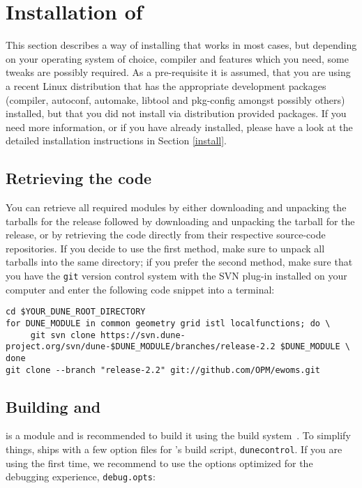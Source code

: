 \section{Installation of \eWoms} \label{quick-install}

This section describes a way of installing \eWoms that works in most
cases, but depending on your operating system of choice, \Cplusplus
compiler and features which you need, some tweaks are possibly
required. As a pre-requisite it is assumed, that you are using a
recent Linux distribution that has the appropriate development
packages (\Cplusplus compiler, autoconf, automake, libtool and
pkg-config amongst possibly others) installed, but that you did not
install \Dune via distribution provided packages.  If you need more
information, or if you have \Dune already installed, please have a
look at the detailed installation instructions in Section
\ref{install}.

\subsection{Retrieving the code}


You can retrieve all required \Dune modules by either downloading and
unpacking the tarballs for the  release followed by
downloading and unpacking the tarball for the  release, or
by retrieving the code directly from their respective source-code
repositories. If you decide to use the first method, make sure to
unpack all tarballs into the same directory; if you prefer the second
method, make sure that you have the \texttt{git} version control
system with the SVN plug-in installed on your computer and enter the
following code snippet into a terminal:
\begin{lstlisting}[style=Bash]
cd $YOUR_DUNE_ROOT_DIRECTORY
for DUNE_MODULE in common geometry grid istl localfunctions; do \
     git svn clone https://svn.dune-project.org/svn/dune-$DUNE_MODULE/branches/release-2.2 $DUNE_MODULE \
done
git clone --branch "release-2.2" git://github.com/OPM/ewoms.git
\end{lstlisting}

\subsection{Building \Dune and \eWoms}
\label{buildIt}

\eWoms is a \Dune module and is recommended to build it using the \Dune
build system~\cite{DUNE-BS}. To simplify things, \eWoms ships with a
few option files for \Dune's build script, \texttt{dunecontrol}. If
you are using \eWoms the first time, we recommend to use the options
optimized for the debugging experience, \texttt{debug.opts}:

